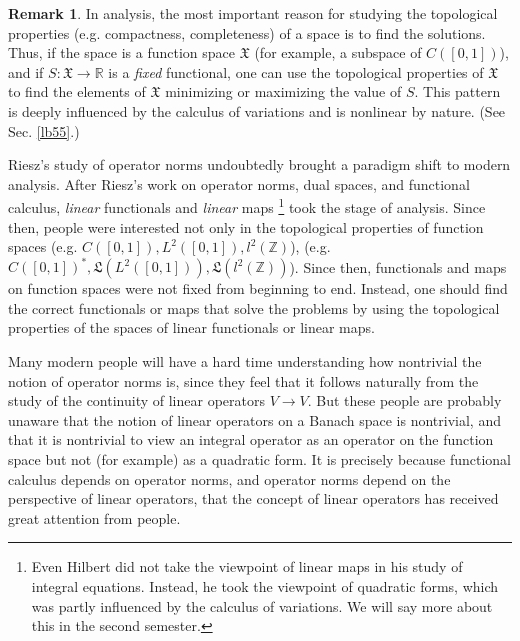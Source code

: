 \documentclass[12pt,b5paper,notitlepage]{article}
\theoremstyle{definition}
\newtheorem{rem}[df]{Remark}
\theoremstyle{plain}
\newcommand{\fk}{\mathfrak}
\newcommand{\Zbb}{\mathbb Z}
\newcommand{\Rbb}{\mathbb R}
\numberwithin{equation}{section}
\begin{document}
\begin{rem}
In analysis, the most important reason for studying the topological properties (e.g. compactness, completeness) of a space is to find the solutions. Thus, if the space is a function space $\fk X$ (for example, a subspace of $C([0,1])$), and if $S:\fk X\rightarrow \Rbb$ is a \textit{fixed} functional, one can use the topological properties of $\fk X$ to find the elements of $\fk X$ minimizing or maximizing the value of $S$. This pattern is deeply influenced by the calculus of variations and is nonlinear by nature. (See Sec. \ref{lb55}.) 

Riesz's study of operator norms undoubtedly brought a paradigm shift to modern analysis. After Riesz's work on operator norms, dual spaces, and functional calculus, \textit{linear} functionals and \textit{linear} maps \footnote{Even Hilbert did not take the viewpoint of linear maps in his study of integral equations. Instead, he took the viewpoint of quadratic forms, which was partly influenced by the calculus of variations. We will say more about this in the second semester.} took the stage of analysis. Since then, people were interested not only in the topological properties of function spaces (e.g. $C([0,1]),L^2([0,1]),l^2(\Zbb)$),  (e.g. $C([0,1])^*,\fk L(L^2([0,1])),\fk L(l^2(\Zbb))$). Since then, functionals and maps on function spaces were not fixed from beginning to end. Instead, one should find the correct functionals or maps that solve the problems by using the topological properties of the spaces of linear functionals or linear maps. \hfill\qedsymbol
\end{rem}

 

Many modern people will have a hard time understanding how nontrivial the notion of operator norms is, since they feel that it follows naturally from the study of the continuity of linear operators $V\rightarrow V$. But these people are probably unaware that the notion of linear operators on a Banach space is nontrivial, and that it is nontrivial to view an integral operator as an operator on the function space but not (for example) as a quadratic form. It is precisely because functional calculus depends on operator norms, and operator norms depend on the perspective of linear operators, that the concept of linear operators has received great attention from people.
\end{document}
